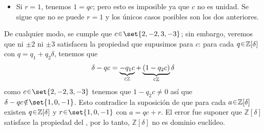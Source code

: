 \begin{sol}
\begin{enumerate}[label={\bfseries\Roman*}., wide, itemsep=1em]
\begin{itemize}
    \item Si $r = 1$, tenemos $1 = qc$; pero esto es imposible ya que $c$ no es unidad. Se sigue que no se puede $r = 1$ y los únicos casos posibles son los dos anteriores.
\end{itemize}
De cualquier modo, se cumple que $c \en \set{2,-2,3,-3}$; sin embargo, veremos que ni $\pm2$ ni $\pm3$ satisfacen la propiedad que supusimos para $c$: para cada $q \en \mathbb{Z}[\delta]$ con $q= q_1 + q_2\delta$, tenemos que
\[
\delta - qc = \underbrace{-q_1c}_{\en\mathbb{Z}} + \underbrace{(1-q_2c)}_{\en\mathbb{Z}}\delta 
\]
como $c\en\set{2,-2,3,-3}$ tenemos que $1 - q_2c\neq 0$ así que $\delta - qc\noten\set{1,0,-1}$. Esto contradice la suposición de que para cada $a\en\mathbb{Z}[\delta]$ existen $q\en\mathbb{Z}[\delta]$ y $r\en\set{1,0,-1}$ con $a = qc + r$. El error fue suponer que $\mathbb{Z}[\delta]$ satisface la propiedad del , por lo tanto, $\mathbb{Z}[\delta]$ no es dominio euclídeo.\par\vspace{1em}


\end{enumerate}
\end{sol}
